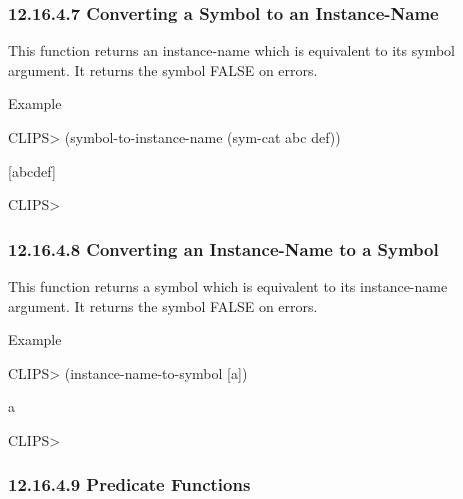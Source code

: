 \documentclass[letterpaper,10pt,english]{sphinxmanual}
\begin{document}
\subsubsection{12.16.4.7 Converting a Symbol to an Instance-Name}
\label{\detokenize{actions:converting-a-symbol-to-an-instance-name}}
This function returns an instance-name which is equivalent to its symbol
argument. It returns the symbol FALSE on errors.


\begin{sphinxVerbatim}[commandchars=\\\{\}]
 
\end{sphinxVerbatim}

Example

CLIPS\textgreater{} (symbol-to-instance-name (sym-cat abc def))

{[}abcdef{]}

CLIPS\textgreater{}


\subsubsection{12.16.4.8 Converting an Instance-Name to a Symbol}
\label{\detokenize{actions:converting-an-instance-name-to-a-symbol}}
This function returns a symbol which is equivalent to its instance-name
argument. It returns the symbol FALSE on errors.


\begin{sphinxVerbatim}[commandchars=\\\{\}]
 
\end{sphinxVerbatim}

Example

CLIPS\textgreater{} (instance-name-to-symbol {[}a{]})

a

CLIPS\textgreater{}


\subsubsection{12.16.4.9 Predicate Functions}
\label{\detokenize{actions:predicate-functions-1}}\label{\detokenize{actions:id6}}
\end{document}
